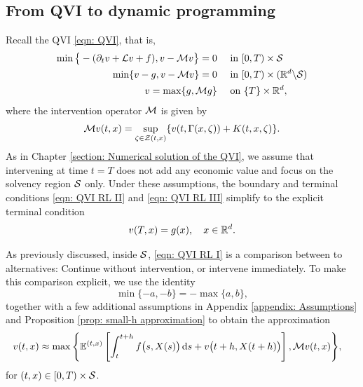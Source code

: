 \subsection{From QVI to dynamic programming}
Recall the QVI \eqref{eqn: QVI}, that is, 
\begin{align}
    \min\big\{ - (\partial_t v + \mathcal{L} v + f), v - \mathcal{M} v \big\} = 0& \quad \text{ in } [0,T) \times \mathcal{S} \label{eqn: QVI RL I} \\
    \min \{v - g, v - \mathcal{M} v \} = 0 & \quad \text{ in } [0,T) \times (\mathbb{R}^d \backslash \mathcal{S}) \label{eqn: QVI RL II} \\
    v = \max\{g, \mathcal{M} g \} & \quad \text{ on } \{T\} \times \mathbb{R}^d \label{eqn: QVI RL III}, 
\end{align}
where the intervention operator $\mathcal{M}$ is given by
\begin{equation*}
    \mathcal{M} v(t,x) = \sup_{\zeta \in \mathcal{Z}(t,x)} \{v(t,\Gamma(x,\zeta)) + K(t,x,\zeta)\}.
\end{equation*}
As in Chapter \ref{section: Numerical solution of the QVI}, we assume that intervening at time $t=T$ does not add any economic value and focus on the solvency region $\mathcal{S}$ only. Under these assumptions, the boundary and terminal conditions \eqref{eqn: QVI RL II} and \eqref{eqn: QVI RL III} simplify to the explicit terminal condition
\begin{equation*}
    v(T,x) = g(x), \quad x \in \mathbb{R}^d. 
\end{equation*}

As previously discussed, inside $\mathcal{S}$, \eqref{eqn: QVI RL I} is a comparison between to alternatives: Continue without intervention, or intervene immediately. To make this comparison explicit, we use the identity 
\begin{equation*}
    \min\{-a,-b\} = -\max\{a,b\},
\end{equation*}
together with a few additional assumptions in Appendix \ref{appendix: Assumptions} and Proposition \ref{prop: small-h approximation} to obtain the approximation
\begin{align}
    v(t,x) \approx \max \Bigg\{ \mathbb{E}^{(t,x)} & \left[ \int_{t}^{t+h} f\big(s,X(s)\big) \,\mathrm{d} s + v\big(t+h,X(t+h) \big) \right], \mathcal{M} v(t,x) \Bigg\}, \label{eqn: QVI RL I DP}
\end{align}
for $(t,x) \in [0,T) \times \mathcal{S}$. 

